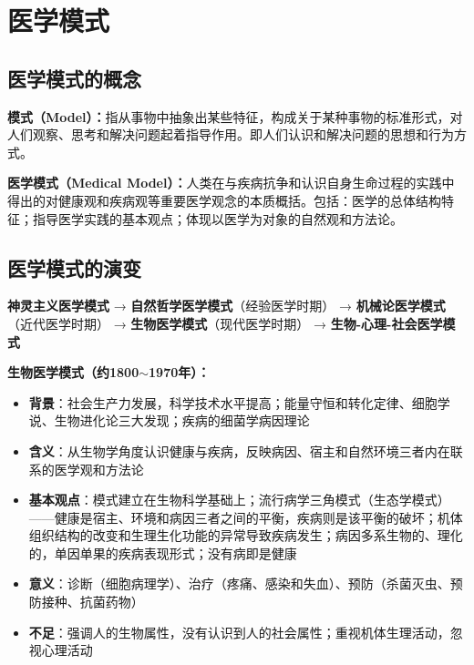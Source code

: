 \chapter{医学模式}
\setcounter{chapter}{2}

\section{医学模式的概念}

\begin{defbox}
\textbf{模式（Model）：}指从事物中抽象出某些特征，构成关于某种事物的标准形式，对人们观察、思考和解决问题起着指导作用。即人们认识和解决问题的思想和行为方式。

\textbf{医学模式（Medical Model）：}人类在与疾病抗争和认识自身生命过程的实践中得出的对健康观和疾病观等重要医学观念的本质概括。包括：医学的总体结构特征；指导医学实践的基本观点；体现以医学为对象的自然观和方法论。
\end{defbox}

\section{医学模式的演变}

\begin{keybox}
\textbf{神灵主义医学模式} → \textbf{自然哲学医学模式}（经验医学时期） → \textbf{机械论医学模式}（近代医学时期） → \textbf{生物医学模式}（现代医学时期） → \textbf{生物-心理-社会医学模式}

\textbf{生物医学模式（约1800$\sim$1970年）：}
\begin{itemize}[leftmargin=*]
    \item \textbf{背景}：社会生产力发展，科学技术水平提高；能量守恒和转化定律、细胞学说、生物进化论三大发现；疾病的细菌学病因理论
    \item \textbf{含义}：从生物学角度认识健康与疾病，反映病因、宿主和自然环境三者内在联系的医学观和方法论
    \item \textbf{基本观点}：模式建立在生物科学基础上；流行病学三角模式（生态学模式）——健康是宿主、环境和病因三者之间的平衡，疾病则是该平衡的破坏；机体组织结构的改变和生理生化功能的异常导致疾病发生；病因多系生物的、理化的，单因单果的疾病表现形式；没有病即是健康
    \item \textbf{意义}：诊断（细胞病理学）、治疗（疼痛、感染和失血）、预防（杀菌灭虫、预防接种、抗菌药物）
    \item \textbf{不足}：强调人的生物属性，没有认识到人的社会属性；重视机体生理活动，忽视心理活动
\end{itemize}
\end{keybox}

